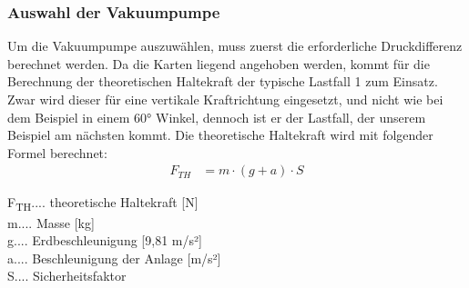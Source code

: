 \subsubsection{Auswahl der Vakuumpumpe}
Um die Vakuumpumpe auszuwählen, muss zuerst die erforderliche Druckdifferenz berechnet werden.
Da die Karten liegend angehoben werden, kommt für die Berechnung der theoretischen Haltekraft der typische Lastfall 1
zum Einsatz.
Zwar wird dieser für eine vertikale Kraftrichtung eingesetzt, und nicht wie bei dem Beispiel in einem
60° Winkel, dennoch ist er der Lastfall, der unserem Beispiel am nächsten kommt.
Die theoretische Haltekraft wird mit folgender Formel berechnet:
\begin{align*}
    F_{TH} &= m \cdot (g + a) \cdot S
\end{align*}

F\textsubscript{TH}.... theoretische Haltekraft [N] \\
m.... Masse [kg]\\
g.... Erdbeschleunigung [9,81 m/s²]\\
a.... Beschleunigung der Anlage [m/s²]\\
S.... Sicherheitsfaktor \\

